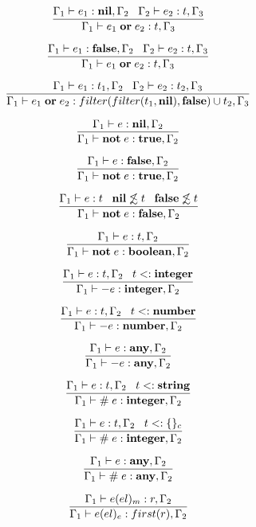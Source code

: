 \[
\dfrac{\Gamma_{1} \vdash e_{1}:\mathbf{nil}, \Gamma_{2} \;\;\;
       \Gamma_{2} \vdash e_{2}:t, \Gamma_{3}}
      {\Gamma_{1} \vdash e_{1} \; \mathbf{or} \; e_{2}:t, \Gamma_{3}}
\]

\[
\dfrac{\Gamma_{1} \vdash e_{1}:\mathbf{false}, \Gamma_{2} \;\;\;
       \Gamma_{2} \vdash e_{2}:t, \Gamma_{3}}
      {\Gamma_{1} \vdash e_{1} \; \mathbf{or} \; e_{2}:t, \Gamma_{3}}
\]

\[
\dfrac{\Gamma_{1} \vdash e_{1}:t_{1}, \Gamma_{2} \;\;\;
       \Gamma_{2} \vdash e_{2}:t_{2}, \Gamma_{3}}
      {\Gamma_{1} \vdash e_{1} \; \mathbf{or} \; e_{2}:filter(filter(t_{1}, \mathbf{nil}), \mathbf{false}) \cup t_{2}, \Gamma_{3}}
\]

\[
\dfrac{\Gamma_{1} \vdash e:\mathbf{nil}, \Gamma_{2}}
      {\Gamma_{1} \vdash \mathbf{not} \; e:\mathbf{true}, \Gamma_{2}}
\]

\[
\dfrac{\Gamma_{1} \vdash e:\mathbf{false}, \Gamma_{2}}
      {\Gamma_{1} \vdash \mathbf{not} \; e:\mathbf{true}, \Gamma_{2}}
\]

\[
\dfrac{\Gamma_{1} \vdash e:t \;\;\;
       \mathbf{nil} \not\lesssim t \;\;\;
       \mathbf{false} \not\lesssim t}
      {\Gamma_{1} \vdash \mathbf{not} \; e:\mathbf{false}, \Gamma_{2}}
\]

\[
\dfrac{\Gamma_{1} \vdash e:t, \Gamma_{2}}
      {\Gamma_{1} \vdash \mathbf{not} \; e:\mathbf{boolean}, \Gamma_{2}}
\]

\[
\dfrac{\Gamma_{1} \vdash e:t, \Gamma_{2} \;\;\;
       t <: \mathbf{integer}}
      {\Gamma_{1} \vdash - e:\mathbf{integer}, \Gamma_{2}}
\]

\[
\dfrac{\Gamma_{1} \vdash e:t, \Gamma_{2} \;\;\;
       t <: \mathbf{number}}
      {\Gamma_{1} \vdash - e:\mathbf{number}, \Gamma_{2}}
\]

\[
\dfrac{\Gamma_{1} \vdash e:\mathbf{any}, \Gamma_{2}}
      {\Gamma_{1} \vdash - e:\mathbf{any}, \Gamma_{2}}
\]

\[
\dfrac{\Gamma_{1} \vdash e:t, \Gamma_{2} \;\;\;
       t <: \mathbf{string}}
      {\Gamma_{1} \vdash \# \; e:\mathbf{integer}, \Gamma_{2}}
\]

\[
\dfrac{\Gamma_{1} \vdash e:t, \Gamma_{2} \;\;\;
       t <: \{\}_{c}}
      {\Gamma_{1} \vdash \# \; e:\mathbf{integer}, \Gamma_{2}}
\]

\[
\dfrac{\Gamma_{1} \vdash e:\mathbf{any}, \Gamma_{2}}
      {\Gamma_{1} \vdash \# \; e:\mathbf{any}, \Gamma_{2}}
\]

\[
\dfrac{\Gamma_{1} \vdash e(el)_{m}:r, \Gamma_{2}}
      {\Gamma_{1} \vdash e(el)_{e}:first(r), \Gamma_{2}}
\]

